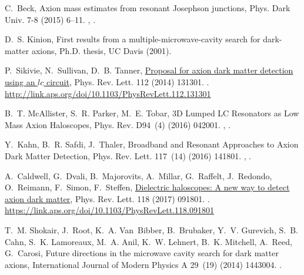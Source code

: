 \documentclass[preprint]{elsarticle}
\begin{document}
\begin{thebibliography}{10}
C.~Beck, {Axion mass estimates from resonant Josephson junctions}, Phys. Dark
  Univ. 7-8 (2015) 6--11.
\newblock \href {http://arxiv.org/abs/1403.5676} {},
  \href {http://dx.doi.org/10.1016/j.dark.2015.03.002}
  {}.

D.~S. Kinion, First results from a multiple-microwave-cavity search for
  dark-matter axions, Ph.D. thesis, UC Davis (2001).

P.~Sikivie, N.~Sullivan, D.~B. Tanner,
  \href{http://link.aps.org/doi/10.1103/PhysRevLett.112.131301}{Proposal for
  axion dark matter detection using an $lc$ circuit}, Phys. Rev. Lett. 112
  (2014) 131301.
\newblock \href {http://dx.doi.org/10.1103/PhysRevLett.112.131301}
  {}.
\newline\urlprefix\url{http://link.aps.org/doi/10.1103/PhysRevLett.112.131301}

B.~T. McAllister, S.~R. Parker, M.~E. Tobar, {3D Lumped LC Resonators as Low
  Mass Axion Haloscopes}, Phys. Rev. D94~(4) (2016) 042001.
\newblock \href {http://arxiv.org/abs/1605.05427} {},
  \href {http://dx.doi.org/10.1103/PhysRevD.94.042001}
  {}.

Y.~Kahn, B.~R. Safdi, J.~Thaler, {Broadband and Resonant Approaches to Axion
  Dark Matter Detection}, Phys. Rev. Lett. 117~(14) (2016) 141801.
\newblock \href {http://arxiv.org/abs/1602.01086} {},
  \href {http://dx.doi.org/10.1103/PhysRevLett.117.141801}
  {}.

A.~Caldwell, G.~Dvali, B.~Majorovits, A.~Millar, G.~Raffelt, J.~Redondo,
  O.~Reimann, F.~Simon, F.~Steffen,
  \href{https://link.aps.org/doi/10.1103/PhysRevLett.118.091801}{Dielectric
  haloscopes: A new way to detect axion dark matter}, Phys. Rev. Lett. 118
  (2017) 091801.
\newblock \href {http://dx.doi.org/10.1103/PhysRevLett.118.091801}
  {}.
\newline\urlprefix\url{https://link.aps.org/doi/10.1103/PhysRevLett.118.091801}

T.~M. Shokair, J.~Root, K.~A. Van~Bibber, B.~Brubaker, Y.~V. Gurevich, S.~B.
  Cahn, S.~K. Lamoreaux, M.~A. Anil, K.~W. Lehnert, B.~K. Mitchell, A.~Reed,
  G.~Carosi, Future directions in the microwave cavity search for dark matter
  axions, International Journal of Modern Physics A 29~(19) (2014) 1443004.
\newblock \href {http://dx.doi.org/10.1142/S0217751X14430040}
  {}.


\end{thebibliography}
\end{document}
